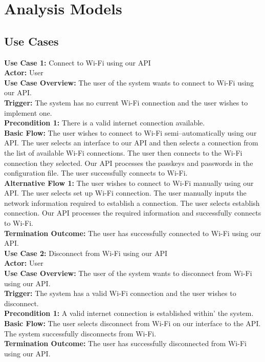 \section{Analysis Models}
\subsection{Use Cases}

\textbf{Use Case 1:} Connect to Wi-Fi using our API\\ 
\textbf{Actor:} User\\
\textbf{Use Case Overview:} The user of the system wants to connect to Wi-Fi using our API.\\
\textbf{Trigger:} The system has no current Wi-Fi connection and the user wishes to implement one.\\
\textbf{Precondition 1:} There is a valid internet connection available.\\
\textbf{Basic Flow:} The user wishes to connect to Wi-Fi semi–automatically using our API. The user selects 
an interface to our API and then selects a connection from the list of available Wi-Fi connections. The user then connects 
to the Wi-Fi connection they selected. Our API processes the passkeys and passwords in the configuration 
file. The user successfully connects to Wi-Fi.\\
\textbf{Alternative Flow 1:} The user wishes to connect to Wi-Fi manually using our API. The user selects set up Wi-Fi 
connection. The user manually inputs the network information required to establish a connection. The user selects 
establish connection. Our API processes the required information and successfully connects to Wi-Fi.\\
\textbf{Termination Outcome:} The user has successfully connected to Wi-Fi using our API.\\

\noindent\textbf{Use Case 2:} Disconnect from Wi-Fi using our API\\
\textbf{Actor:} User\\
\textbf{Use Case Overview:} The user of the system wants to disconnect from Wi-Fi using our API.\\
\textbf{Trigger:} The system has a valid Wi-Fi connection and the user wishes to disconnect.\\
\textbf{Precondition 1:} A valid internet connection is established within’ the system.\\
\textbf{Basic Flow:} The user selects disconnect from Wi-Fi on our interface to the API. The system successfully disconnects from Wi-Fi.\\
\textbf{Termination Outcome:} The user has successfully disconnected from Wi-Fi using our API.\\
